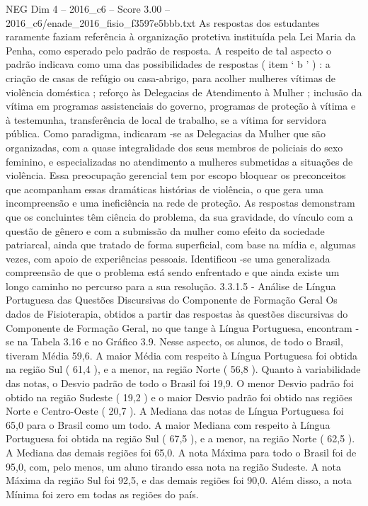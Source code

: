\begin{textsample}{NEG Dim 4 – 2016\_c6 – Score 3.00 – 2016\_c6/enade\_2016\_fisio\_f3597e5bbb.txt}
As respostas dos estudantes raramente faziam referência à organização protetiva instituída pela Lei Maria da Penha, como esperado pelo padrão de resposta.
A respeito de tal aspecto o padrão indicava como uma das possibilidades de respostas ( item ‘ b ’ ) : a criação de casas de refúgio ou casa-abrigo, para acolher mulheres vítimas de violência doméstica ; reforço às Delegacias de Atendimento à Mulher ; inclusão da vítima em programas assistenciais do governo, programas de proteção à vítima e à testemunha, transferência de local de trabalho, se a vítima for servidora pública.
Como paradigma, indicaram -se as Delegacias da Mulher que são organizadas, com a quase integralidade dos seus membros de policiais do sexo feminino, e especializadas no atendimento a mulheres submetidas a situações de violência.
Essa preocupação gerencial tem por escopo bloquear os preconceitos que acompanham essas dramáticas histórias de violência, o que gera uma incompreensão e uma ineficiência na rede de proteção.
As respostas demonstram que os concluintes têm ciência do problema, da sua gravidade, do vínculo com a questão de gênero e com a submissão da mulher como efeito da sociedade patriarcal, ainda que tratado de forma superficial, com base na mídia e, algumas vezes, com apoio de experiências pessoais.
Identificou -se uma generalizada compreensão de que o problema está sendo enfrentado e que ainda existe um longo caminho no percurso para a sua resolução. 3.3.1.5 - Análise de Língua Portuguesa das Questões Discursivas do Componente de Formação Geral Os dados de Fisioterapia, obtidos a partir das respostas às questões discursivas do Componente de Formação Geral, no que tange à Língua Portuguesa, encontram -se na Tabela 3.16 e no Gráfico 3.9.
Nesse aspecto, os alunos, de todo o Brasil, tiveram Média 59,6.
A maior Média com respeito à Língua Portuguesa foi obtida na região Sul ( 61,4 ), e a menor, na região Norte ( 56,8 ).
Quanto à variabilidade das notas, o Desvio padrão de todo o Brasil foi 19,9.
O menor Desvio padrão foi obtido na região Sudeste ( 19,2 ) e o maior Desvio padrão foi obtido nas regiões Norte e Centro-Oeste ( 20,7 ).
A Mediana das notas de Língua Portuguesa foi 65,0 para o Brasil como um todo.
A maior Mediana com respeito à Língua Portuguesa foi obtida na região Sul ( 67,5 ), e a menor, na região Norte ( 62,5 ).
A Mediana das demais regiões foi 65,0.
A nota Máxima para todo o Brasil foi de 95,0, com, pelo menos, um aluno tirando essa nota na região Sudeste.
A nota Máxima da região Sul foi 92,5, e das demais regiões foi 90,0.
Além disso, a nota Mínima foi zero em todas as regiões do país.

\end{textsample}
